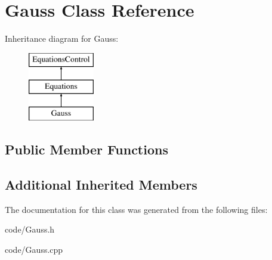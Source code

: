 \hypertarget{class_gauss}{}\section{Gauss Class Reference}
\label{class_gauss}
Inheritance diagram for Gauss\+:\begin{figure}[H]
\begin{center}
\leavevmode
\includegraphics[height=3.000000cm]{class_gauss}
\end{center}
\end{figure}
\subsection*{Public Member Functions}
\begin{DoxyCompactItemize}
\end{DoxyCompactItemize}
\subsection*{Additional Inherited Members}


The documentation for this class was generated from the following files\+:\begin{DoxyCompactItemize}
\item 
code/Gauss.\+h\item 
code/Gauss.\+cpp\end{DoxyCompactItemize}

